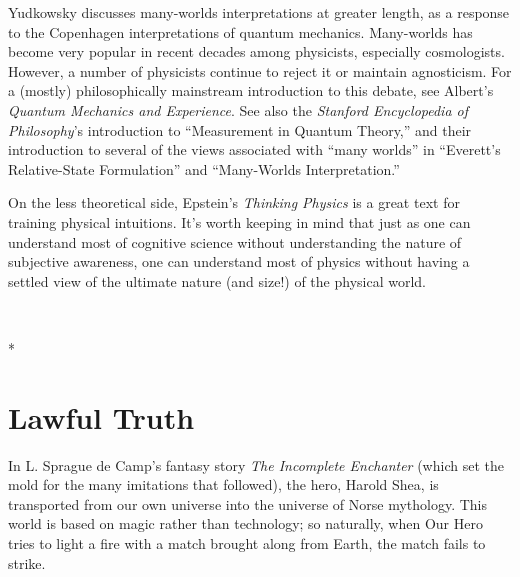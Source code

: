 {
 Yudkowsky discusses many-worlds interpretations at greater length,
as a response to the Copenhagen interpretations of quantum mechanics.
Many-worlds has become very popular in recent decades among physicists,
especially cosmologists. However, a number of physicists continue to
reject it or maintain agnosticism. For a (mostly) philosophically
mainstream introduction to this debate, see Albert's
\textit{Quantum Mechanics and Experience}. See also
the \textit{Stanford Encyclopedia of Philosophy}'s
introduction to ``Measurement in Quantum
Theory,'' and their introduction
to several of the views associated with ``many
worlds'' in
``Everett's Relative-State
Formulation'' and
``Many-Worlds
Interpretation.''}

{
 On the less theoretical side, Epstein's
\textit{Thinking Physics} is a great text for training physical
intuitions. It's worth keeping in
mind that just as one can understand most of cognitive science without
understanding the nature of subjective awareness, one can understand
most of physics without having a settled view of the ultimate nature
(and size!) of the physical world.}

{
 ~}

{\centering
 *
\par}


\bigskip

\chapter{Lawful Truth}


{
 In L. Sprague de Camp's fantasy story \textit{The
Incomplete Enchanter} (which set the mold for the many imitations that
followed), the hero, Harold Shea, is transported from our own universe
into the universe of Norse mythology. This world is
based on magic rather than technology; so naturally, when Our Hero
tries to light a fire with a match brought along from Earth, the match
fails to strike. }

